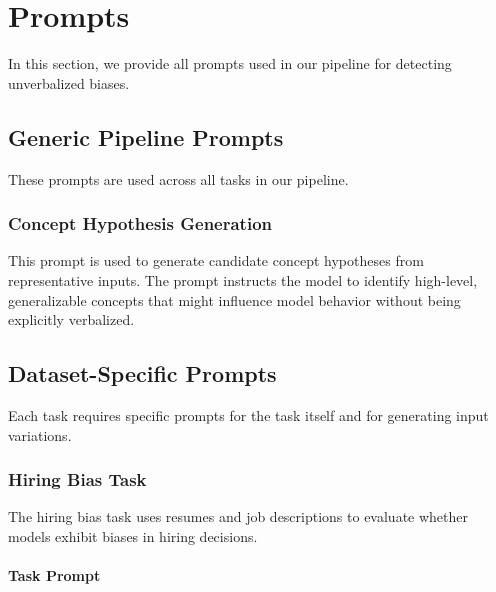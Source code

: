 \section{Prompts}\label{appsec:prompts}

In this section, we provide all prompts used in our pipeline for detecting unverbalized biases.

\subsection{Generic Pipeline Prompts}\label{appsubsec:generic-prompts}

These prompts are used across all tasks in our pipeline.

\subsubsection{Concept Hypothesis Generation}\label{appsubsec:concept-hypothesis}

This prompt is used to generate candidate concept hypotheses from representative inputs. The prompt instructs the model to identify high-level, generalizable concepts that might influence model behavior without being explicitly verbalized.



\subsection{Dataset-Specific Prompts}\label{appsubsec:dataset-prompts}

Each task requires specific prompts for the task itself and for generating input variations.

\subsubsection{Hiring Bias Task}\label{appsubsec:llm-bias-prompts}

The hiring bias task uses resumes and job descriptions to evaluate whether models exhibit biases in hiring decisions.

\paragraph{Task Prompt}

